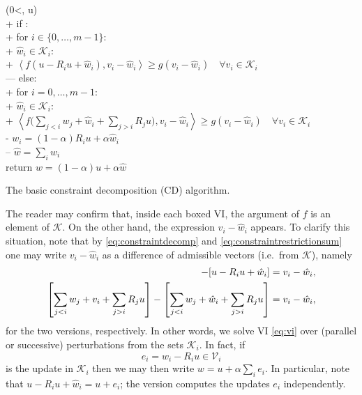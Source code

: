 \documentclass[letterpaper,final,12pt,reqno]{amsart}
\theoremstyle{cstyle}
\theoremstyle{cstyle*}
\theoremstyle{dstyle}
\numberwithin{equation}{section}
\numberwithin{figure}{section}
\numberwithin{table}{section}
\numberwithin{theorem}{section}
\newcommand{\cK}{\mathcal{K}}
\newcommand{\cV}{\mathcal{V}}
\newcommand{\ip}[2]{\left<#1,#2\right>}
\begin{document}
\begin{pseudofloat}
\begin{pseudo*}
(0<\alpha{}, u\in\cK)\text{:} \\+
    if : \\+
        for $i \in \{0,\dots,m-1\}$: \\+
            $\hat w_i\in \cK_i$: \\+
                 $\boxed{\ip{f(u - R_i u + \hat w_i)}{v_i-\hat w_i} \ge g(v_i-\hat w_i)} \quad \forall v_i\in \cK_i$ \\---
    else: \\+
        for $i = 0,\dots,m-1$: \\+
            $\hat w_i\in \cK_i$: \\+
                $\displaystyle \boxed{\ip{f\Big(\sum_{j<i} w_j + \hat w_i + \sum_{j>i} R_j u\Big)}{v_i-\hat w_i} \ge g(v_i-\hat w_i)} \quad \forall v_i\in \cK_i$ \\-
            $w_i = (1-\alpha) R_i u + \alpha \hat w_i$ \\--
    $\hat w = \sum_i \hat w_i$ \\
    return $w=(1-\alpha) u + \alpha \hat w$
\end{pseudo*}
\caption{The basic constraint decomposition (CD) algorithm.}
\label{alg:basiccd}
\end{pseudofloat}

The reader may confirm that, inside each boxed VI, the argument of $f$ is an element of $\cK$.  On the other hand, the expression $v_i - \hat w_i$ appears.  To clarify this situation, note that by \eqref{eq:constraintdecomp} and \eqref{eq:constraintrestrictionsum} one may write $v_i - \hat w_i$ as a difference of admissible vectors (i.e.~from $\cK$), namely
\begin{align*}
[u - R_i u + v_i] - [u - R_i u + \hat w_i] &= v_i - \hat w_i, \label{eq:admissibledifference} \\
\left[\sum_{j<i} w_j + v_i + \sum_{j>i} R_j u\right] - \left[\sum_{j<i} w_j + \hat w_i + \sum_{j>i} R_j u\right] &= v_i - \hat w_i,  \notag
\end{align*}
for the two versions, respectively.  In other words, we solve VI \eqref{eq:vi} over (parallel or successive) perturbations from the sets $\cK_i$.  In fact, if
\begin{equation}
e_i = \hat w_i - R_i u \in \cV_i \label{eq:ithupdate}
\end{equation}
is the update in $\cK_i$ then we may then write $w = u + \alpha \sum_i e_i$.  In particular, note that $u - R_i u + \hat w_i = u + e_i$; the  version computes the updates $e_i$ independently.
\end{document}
